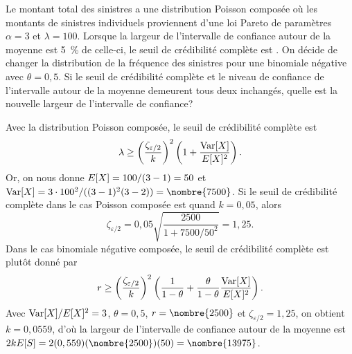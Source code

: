 \begin{exercice}
  Le montant total des sinistres a une distribution Poisson composée
  où les montants de sinistres individuels proviennent d'une loi
  Pareto de paramètres $\alpha = 3$ et $\lambda = 100$. Lorsque la
  largeur de l'intervalle de confiance autour de la moyenne est 5~\%
  de celle-ci, le seuil de crédibilité complète est . On
  décide de changer la distribution de la fréquence des sinistres pour
  une binomiale négative avec $\theta = 0,5$. Si le seuil de
  crédibilité complète et le niveau de confiance de l'intervalle
  autour de la moyenne demeurent tous deux inchangés, quelle est la
  nouvelle largeur de l'intervalle de confiance?
  \begin{rep}
  \end{rep}
  \begin{sol}
    Avec la distribution Poisson composée, le seuil de crédibilité
    complète est
    \begin{displaymath}
      \lambda \geq
      \left( \frac{\zeta_{\varepsilon/2}}{k} \right)^2
      \left( 1 + \frac{\operatorname{Var} [ X ]}{E [ X ]^2} \right).
    \end{displaymath}
    Or, on nous donne $E [ X ] = 100/(3 - 1) = 50$ et $\var{X} = 3
    \cdot 100^2/((3 - 1)^2 (3 - 2)) = \nombre{7500}$. Si le seuil de
    crédibilité complète dans le cas Poisson composée est
     quand $k = 0,05$, alors
    \begin{displaymath}
      \zeta_{\varepsilon/2}
      = 0,05 \sqrt{\frac{2500}{1 + 7500/50^2}}
      = 1,25.
    \end{displaymath}
    Dans le cas binomiale négative composée, le seuil de crédibilité
    complète est plutôt donné par
    \begin{displaymath}
      r \geq
      \left(
        \frac{\zeta_{\varepsilon/2}}{k}
      \right)^2
      \left(
        \frac{1}{1 - \theta} +
        \frac{\theta}{1-\theta} \frac{\operatorname{Var} [ X ]}{E [ X ]^2}
      \right).
    \end{displaymath}
    Avec $\operatorname{Var} [ X ]/E [ X ]^2 = 3$, $\theta = 0,5$, $r = \nombre{2500}$
    et $\zeta_{\varepsilon/2} = 1,25$, on obtient $k = 0,0559$, d'où la
    largeur de l'intervalle de confiance autour de la moyenne est $2 k
    \esp{S} = 2 (0,559) (\nombre{2500}) (50) = \nombre{13975}$.
  \end{sol}
\end{exercice}

